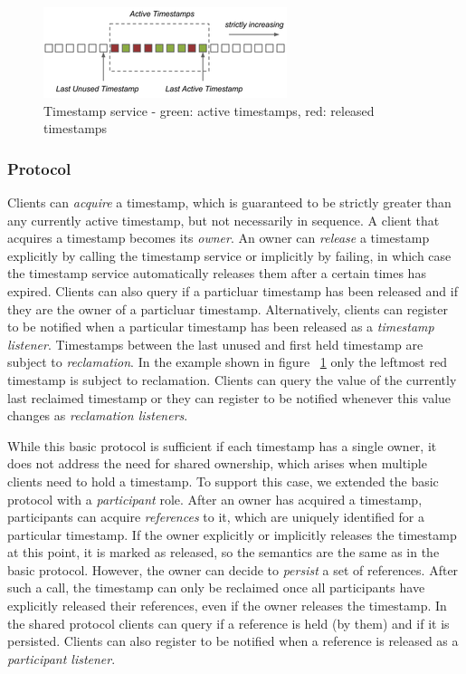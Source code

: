 \documentclass[10pt,final,journal]{IEEEtran}
\begin{document}
\begin{figure}[!t]
\centering
\hspace*{-.2in}
\includegraphics{images/ts-resized.png}
\caption{Timestamp service - green: active timestamps, red: released timestamps}
\label{ts}
\end{figure}

\subsubsection{Protocol}
Clients can \emph{acquire} a timestamp, which is guaranteed to be strictly greater than any currently active timestamp, but not necessarily in sequence. A client that acquires a timestamp becomes its \emph{owner}. An owner can \emph{release} a timestamp explicitly by calling the timestamp service or implicitly by failing, in which case the timestamp service automatically releases them after a certain times has expired. Clients can also query if a particluar timestamp has been released and if they are the owner of a particluar timestamp. Alternatively, clients can register to be notified when a particular timestamp has been released as a \emph{timestamp listener}. Timestamps between the last unused and first held timestamp are subject to \emph{reclamation}. In the example shown in figure ~\ref{ts} only the leftmost red timestamp is subject to reclamation. Clients can query the value of the currently last reclaimed timestamp or they can register to be notified whenever this value changes as \emph{reclamation listeners}.

While this basic protocol is sufficient if each timestamp has a single owner, it does not address the need for shared ownership, which arises when multiple clients need to hold a timestamp. To support this case, we extended the basic protocol with a \emph{participant} role. After an owner has acquired a timestamp, participants can acquire \emph{references} to it, which are uniquely identified for a particular timestamp. If the owner explicitly or implicitly releases the timestamp at this point, it is marked as released, so the semantics are the same as in the basic protocol. However, the owner can decide to \emph{persist} a set of references. After such a call, the timestamp can only be reclaimed once all participants have explicitly released their references, even if the owner releases the timestamp. In the shared protocol clients can query if a reference is held (by them) and if it is persisted. Clients can also register to be notified when a reference is released as a \emph{participant listener}.
\end{document}
